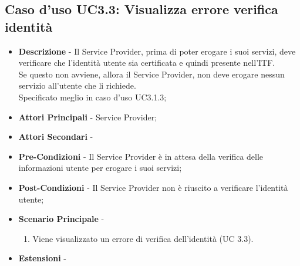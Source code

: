 \subsection{Caso d'uso UC3.3: Visualizza errore verifica identità}
\begin{itemize}
	\item \textbf{Descrizione} - Il Service Provider, prima di poter erogare i suoi servizi, deve verificare che l'identità utente sia certificata e quindi presente nell'\gls{ITF}.\\
	Se questo non avviene, allora il Service Provider, non deve erogare nessun servizio all'utente che li richiede.\\
	Specificato meglio in caso d'uso UC3.1.3;
	\item \textbf{Attori Principali} - Service Provider;
	\item \textbf{Attori Secondari} -
	\item \textbf{Pre-Condizioni} - Il Service Provider è in attesa della verifica delle informazioni utente per erogare i suoi servizi;
	\item \textbf{Post-Condizioni} - Il Service Provider non è riuscito a verificare l'identità utente;
	\item \textbf{Scenario Principale} -
	\begin{enumerate}
		\item Viene visualizzato un errore di verifica dell'identità (UC 3.3).
	\end{enumerate}
	\item \textbf{Estensioni} -
\end{itemize}
